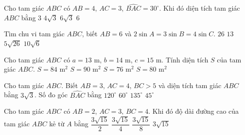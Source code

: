 	\begin{ex}%
		Cho tam giác $ABC$ có $AB=4$, $AC=3$, $\widehat{BAC}=30^\circ$. Khi đó diện tích tam giác $ABC$ bằng
		\choice
		{\True $3$}
		{$4\sqrt{3}$}
		{$6\sqrt{3}$}
		{$6$}
	\end{ex}
	\begin{ex}%
		Tìm chu vi tam giác $ABC$, biết $AB=6$ và $2\sin A=3\sin B=4\sin C$.
		\choice
		{\True $26$}
		{$13$}
		{$5\sqrt{26}$}
		{$10\sqrt{6}$}
	\end{ex}
	\begin{ex}%
		Cho tam giác $ABC$ có $a=13$ m, $b= 14$ m, $c=15$ m. Tính diện tích $S$ của tam giác $ABC$.
		\choice
		{\True $S= 84$ m$^2$}
		{$S= 90$ m$^2$}
		{$S= 76$ m$^2$}
		{$S= 80$ m$^2$}
	\end{ex}
	\begin{ex}%
		Cho tam giác $ABC$. Biết $AB=3$, $AC=4$, $BC>5$ và diện tích tam giác $ABC$ bằng $3\sqrt{3}$. Số đo góc $\widehat{BAC}$ bằng
		\choice
		{\True $120^{\circ}$}
		{$60^{\circ}$}
		{$135^{\circ}$}
		{$45^{\circ}$}
	\end{ex}
	\begin{ex}%
		Cho tam giác $ABC$ có $AB=2$, $AC=3$, $BC=4$. Khi đó độ dài đường cao của tam giác $ABC$ kẻ từ $A$ bằng
		\choice
		{$\dfrac{3\sqrt{15}}{2}$}
		{$\dfrac{3\sqrt{15}}{4}$}
		{\True $\dfrac{3\sqrt{15}}{8}$}
		{$3\sqrt{15}$}
	\end{ex}
